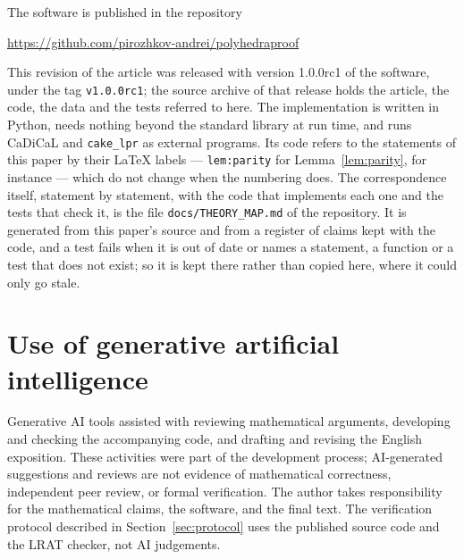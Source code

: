 \documentclass[11pt,reqno]{amsart}
\theoremstyle{plain}
\theoremstyle{definition}
\begin{document}
The software is published in the repository
\begin{center}
\url{https://github.com/pirozhkov-andrei/polyhedraproof}
\end{center}
This revision of the article was released with version 1.0.0rc1 of the software, under the tag
\texttt{v1.0.0rc1}; the source archive of that release holds the article, the code, the data and the
tests referred to here. The implementation is written in Python, needs nothing beyond the standard
library at run time,
and runs CaDiCaL and \texttt{cake\_lpr} as external programs. Its code
refers to the statements of this paper by their \LaTeX{}
labels --- \texttt{lem:parity} for Lemma~\ref{lem:parity}, for instance --- which do not change when
the numbering does. The correspondence itself, statement by statement, with the code that implements
each one and the tests that check it, is the file \texttt{docs/THEORY\_MAP.md} of the repository. It
is generated from this paper's source and from a register of claims kept with the code, and a test
fails when it is out of date or names a statement, a function or a test that does not exist; so it
is kept there rather than copied here, where it could only go stale.

\section*{Use of generative artificial intelligence}
Generative AI tools assisted with reviewing mathematical arguments, developing and checking the
accompanying code, and drafting and revising the English exposition. These activities were part of
the development process; AI-generated suggestions and reviews are not evidence of mathematical
correctness, independent peer review, or formal verification. The author takes responsibility for
the mathematical claims, the software, and the final text. The verification protocol described in
Section~\ref{sec:protocol} uses the published source code and the LRAT checker, not AI judgements.
\end{document}
